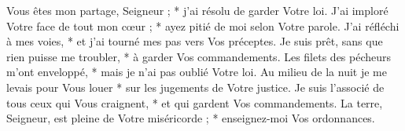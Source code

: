 Vous êtes mon partage, Seigneur ; * j'ai résolu de garder Votre loi.
\versseparator
J'ai imploré Votre face de tout mon cœur ; * ayez pitié de moi selon Votre parole.
\versseparator
J'ai réfléchi à mes voies, * et j'ai tourné mes pas vers Vos préceptes.
\versseparator
Je suis prêt, sans que rien puisse me troubler, * à garder Vos commandements.
\versseparator
Les filets des pécheurs m'ont enveloppé, * mais je n'ai pas oublié Votre loi.
\versseparator
Au milieu de la nuit je me levais pour Vous louer * sur les jugements de Votre justice.
\versseparator
Je suis l'associé de tous ceux qui Vous craignent, * et qui gardent Vos commandements.
\versseparator
La terre, Seigneur, est pleine de Votre miséricorde ; * enseignez-moi Vos ordonnances.